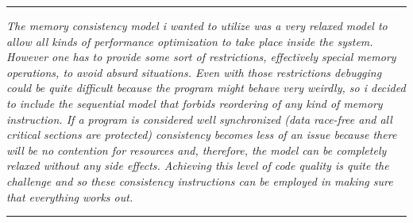     \par\noindent\rule{\textwidth}{0.4pt}
    \textit{The memory consistency model i wanted to utilize was a very relaxed model to allow all kinds of performance optimization to take place inside the system. However one has to provide some sort of restrictions, effectively special memory operations, to avoid absurd situations. Even with those restrictions debugging could be quite difficult because the program might behave very weirdly, so i decided to include the sequential model that forbids reordering of any kind of memory instruction. If a program is considered well synchronized (data race-free and all critical sections are protected) consistency becomes less of an issue because there will be no contention for resources and, therefore, the model can be completely relaxed without any side effects. Achieving this level of code quality is quite the challenge and so these consistency instructions can be employed in making sure that everything works out.}
    \par\noindent\rule{\textwidth}{0.4pt}
